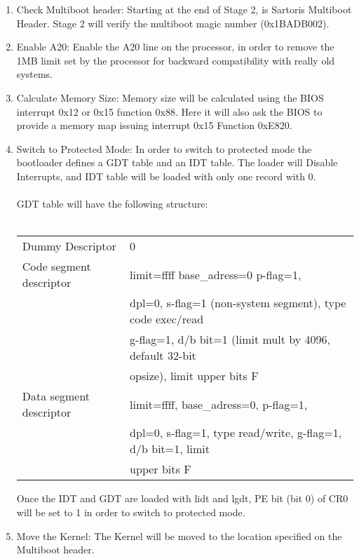 \documentclass[11pt, letterpaper, twoside, english]{book}
\begin{document}
\begin{enumerate}
\item[] \textsf{Check Multiboot header}: Starting at the end of Stage 2, is Sartoris Multiboot Header. Stage 2 will verify the multiboot magic number (0x1BADB002).
\item[] \textsf{Enable A20}: Enable the A20 line on the processor, in order to remove the 1MB limit set by the processor for backward compatibility with really old systems. 
\item[] \textsf{Calculate Memory Size}: Memory size will be calculated using the BIOS interrupt 0x12 or 0x15 function 0x88. Here it will also ask the BIOS to provide a memory map issuing interrupt 0x15 Function 0xE820. 
\item[] \textsf{Switch to Protected Mode}: In order to switch to protected mode the bootloader defines a GDT table and an IDT table. The loader will Disable Interrupts, and IDT table will be loaded with only one record with 0.\\
\\
GDT table will have the following structure:\\
\\
\begin{center}
	\begin{tabular}{|l | l |}
	\hline
Dummy Descriptor &	0 \\
Code segment descriptor &	limit=ffff base\_adress=0 p-flag=1, \\
 & dpl=0, s-flag=1 (non-system segment), type code exec/read \\
 & g-flag=1, d/b bit=1 (limit mult by 4096, default 32-bit \\
 & opsize), limit upper bits F \\
Data segment descriptor &	limit=ffff, base\_adress=0, p-flag=1, \\
 & dpl=0, s-flag=1, type read/write, g-flag=1, d/b bit=1, limit \\
 & upper bits F\\
 \hline
	\end{tabular}
\end{center}

Once the IDT and GDT are loaded with lidt and lgdt, PE bit (bit 0) of CR0 will be set to 1 in order to switch to protected mode.
\item[] \textsf{Move the Kernel}: The Kernel will be moved to the location specified on the Multiboot header.
\end{enumerate}
\end{document}
